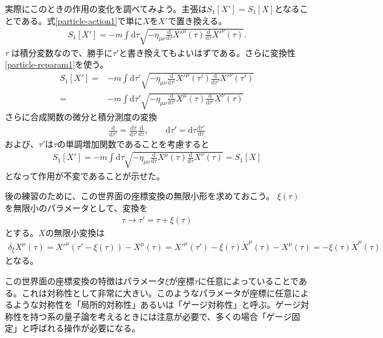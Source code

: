\documentclass[report,paper=a4, fontsize=12pt, line_length=16cm, number_of_lines=33,dvipdfmx]{jlreq}
\numberwithin{equation}{chapter}
\numberwithin{equation}{section}
\newcommand{\di}{\mathrm{d}}
\begin{document}
実際にこのときの作用の変化を調べてみよう。主張は$S_{1}[X']=S_{1}[X]$となることである。式\eqref{particle-action1}で単に$X$を$X'$で置き換える。
\begin{align}
 S_{1}[X']=-m\int \di \tau \sqrt{-\eta_{\mu\nu}\frac{\di}{\di\tau}X'^{\mu}(\tau) \frac{\di}{\di\tau}X'^{\nu}(\tau)}.
\end{align}
$\tau$ は積分変数なので、勝手に$\tau'$と書き換えてもよいはずである。さらに変換性\eqref{particle-reparam1}を使う。
\begin{align}
 S_{1}[X']
=&-m\int \di \tau' \sqrt{-\eta_{\mu\nu}\frac{\di}{\di\tau'}X'^{\mu}(\tau') \frac{\di}{\di\tau'}X'^{\nu}(\tau')}\\
=&-m\int \di \tau' \sqrt{-\eta_{\mu\nu}\frac{\di}{\di\tau'}X^{\mu}(\tau) \frac{\di}{\di\tau'}X^{\nu}(\tau)}
\end{align}
さらに合成関数の微分と積分測度の変換
\begin{align}
 \frac{\di}{\di \tau'}=\frac{\di \tau}{\di \tau'}\frac{\di}{\di\tau},\qquad \di \tau'=\di \tau\frac{\di \tau'}{\di \tau}
\end{align}
および、$\tau'$は$\tau$の単調増加関数であることを考慮すると
\begin{align}
 S_{1}[X']
=-m\int \di\tau \sqrt{-\eta_{\mu\nu}\frac{\di}{\di\tau}X^{\mu}(\tau) \frac{\di}{\di\tau}X^{\nu}(\tau)}
=S_{1}[X]
\end{align}
となって作用が不変であることが示せた。



後の練習のために、この世界面の座標変換の無限小形を求めておこう。
$\xi(\tau)$ を無限小のパラメータとして、変換を
\begin{align}
 \tau \to \tau'=\tau+\xi(\tau)
\end{align}
とする。$X$の無限小変換は
\begin{align}
 \delta_{\xi} X^{\mu}(\tau)
=X'^{\mu}(\tau'-\xi(\tau))-X^{\mu}(\tau)
=X'^{\mu}(\tau')-\xi(\tau) \dot{X}^{\mu}(\tau)-X^{\mu}(\tau)
=-\xi(\tau) \dot{X}^{\mu}(\tau)
\end{align}
となる。

この世界面の座標変換の特徴はパラメータ$\xi$が座標$\tau$に任意によっていることである。これは対称性として非常に大きい。このようなパラメータが座標に任意によるような対称性を「局所的対称性」あるいは「ゲージ対称性」と呼ぶ。ゲージ対称性を持つ系の量子論を考えるときには注意が必要で、多くの場合「ゲージ固定」と呼ばれる操作が必要になる。
\end{document}
